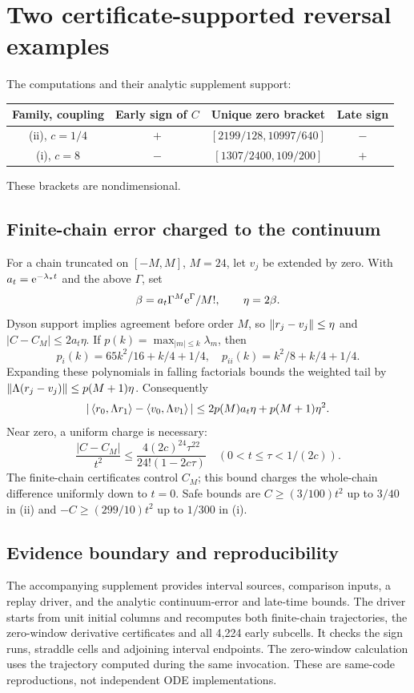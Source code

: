 \documentclass[11pt]{article}
\begin{document}
\section{Two certificate-supported reversal examples}
The computations and their analytic supplement \cite{Internal} support:
\begin{center}
\begin{tabular}{c c c c}
\toprule
Family, coupling & Early sign of $C$ & Unique zero bracket & Late sign\\
\midrule
(ii), $c=1/4$ & $+$ & $[2199/128,10997/640]$ & $-$\\
(i), $c=8$ & $-$ & $[1307/2400,109/200]$ & $+$\\
\bottomrule
\end{tabular}
\end{center}
These brackets are nondimensional.

\subsection{Finite-chain error charged to the continuum}
For a chain truncated on $[-M,M]$, $M=24$, let $v_j$ be extended by zero.
With $a_t=\mathrm e^{-\lambda_*t}$ and the above $\Gamma$, set
\[
 \beta=a_t\Gamma^M\mathrm e^\Gamma/M!,\qquad \eta=2\beta.
\]
Dyson support implies agreement before order $M$, so
$\left\lVert r_j-v_j\right\rVert\leq\eta$ and $|C-C_M|\leq2a_t\eta$.
If $p(k)=\max_{|m|\leq k}\lambda_m$, then
\[
 p_i(k)=65k^2/16+k/4+1/4,\quad
 p_{ii}(k)=k^2/8+k/4+1/4 .
\]
Expanding these polynomials in falling factorials bounds the weighted
tail by $\left\lVert \Lambda(r_j-v_j)\right\rVert\leq p(M+1)\eta$. Consequently
\[
 |\left\langle r_0,\Lambda r_1\right\rangle-\left\langle v_0,\Lambda v_1\right\rangle|
 \leq2p(M)a_t\eta+p(M+1)\eta^2 .
\]
Near zero, a uniform charge is necessary:
\[
 \frac{|C-C_M|}{t^2}
 \leq \frac{4(2c)^{24}\tau^{22}}{24!(1-2c\tau)}
 \quad(0<t\leq\tau<1/(2c)).
\]
The finite-chain certificates control $C_M$; this bound charges the
whole-chain difference uniformly down to $t=0$.
Safe bounds are $C\geq(3/100)t^2$ up to $3/40$ in (ii) and
$-C\geq(299/10)t^2$ up to $1/300$ in (i).

\subsection{Evidence boundary and reproducibility}
The accompanying supplement provides interval sources, comparison inputs,
a replay driver, and the analytic continuum-error and late-time bounds.
The driver starts from unit initial columns and recomputes both finite-chain
trajectories, the zero-window derivative certificates and all 4,224 early
subcells. It checks the sign runs, straddle cells and adjoining interval
endpoints. The zero-window calculation uses the trajectory computed during
the same invocation. These are same-code reproductions, not independent
ODE implementations.
\end{document}
